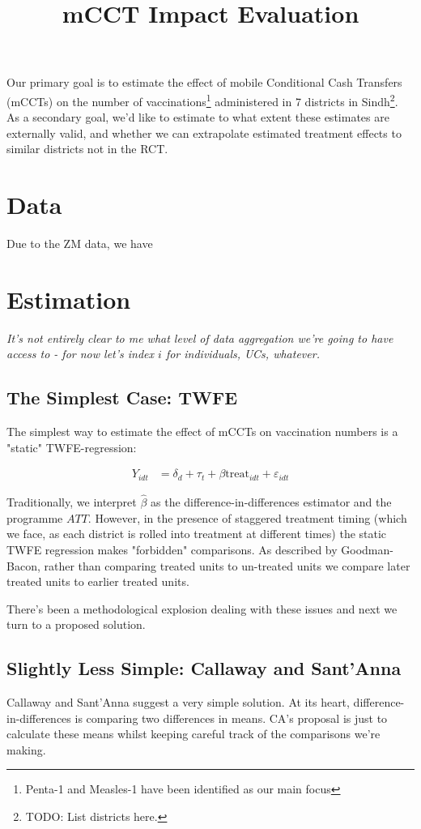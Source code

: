 \documentclass{article}
\title{mCCT Impact Evaluation}
\begin{document}
\maketitle


Our primary goal is to estimate the effect of mobile Conditional Cash Transfers (mCCTs)
on the number of vaccinations\footnote{Penta-1 and Measles-1 have been identified as 
our main focus} administered in 7 districts in Sindh\footnote{TODO: List 
districts here.}. As a secondary goal, we'd like to estimate to what extent these 
estimates are externally valid, and whether we can extrapolate estimated treatment 
effects to similar districts not in the RCT. 


\section{Data}
Due to the ZM data, we have 



\section{Estimation}


\textit{It's not entirely clear to me what level of data aggregation we're going to have 
access to - for now let's index $i$ for individuals, UCs, whatever.}


\subsection*{The Simplest Case: TWFE}
The simplest way to estimate the effect of mCCTs on vaccination numbers is a 
"static" TWFE-regression:


\begin{align*}
   Y_{idt} &= \delta_d + \tau_t + \beta \text{treat}_{idt} + \varepsilon_{idt} 
\end{align*}

Traditionally, we interpret $\hat{\beta}$ as the difference-in-differences estimator 
and the programme $ATT$. However, in the presence of staggered treatment timing 
(which we face, as each district is rolled into treatment at different times) the 
static TWFE regression makes "forbidden" comparisons. As described by Goodman-Bacon, rather than comparing treated 
units to un-treated units we compare later treated units to earlier treated units.

There's been a methodological explosion dealing with these issues and next we 
turn to a proposed solution.

\subsection*{Slightly Less Simple: Callaway and Sant'Anna}

Callaway and Sant'Anna suggest a very simple solution. At its heart, difference-in-differences
is comparing two differences in means. CA's proposal is just to calculate these means
whilst keeping careful track of the comparisons we're making.
\end{document}
